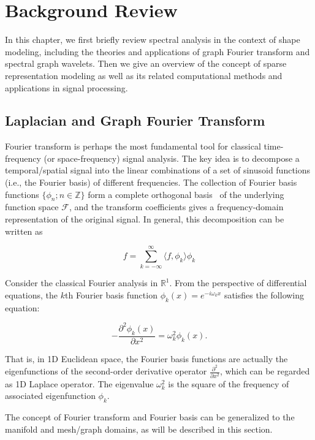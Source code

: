 \chapter{Background Review}
\label{chap:background}

In this chapter, we first briefly review spectral analysis in the context
of shape modeling, including the theories and applications of graph Fourier
transform and spectral graph wavelets. Then we give an overview of the
concept of sparse representation modeling as well as its related computational
methods and applications in signal processing.

\section{Laplacian and Graph Fourier Transform}

Fourier transform is perhaps the most fundamental tool for classical
time-frequency (or space-frequency) signal analysis. The key idea is to decompose
a temporal/spatial signal into the linear combinations of a set of sinusoid
functions (i.e., the Fourier basis) of different frequencies. The collection of
Fourier basis functions $\{\phi_n;n\in \mathbb{Z}\}$ form a complete orthogonal
basis~\cite{Gomes:1999} of the underlying function space $\mathcal{F}$, and the
transform coefficients gives a frequency-domain representation of the original
signal. In general, this decomposition can be written as

\begin{equation}
f=\sum_{k=-\infty}^\infty \langle f,\phi_k\rangle\phi_k
\end{equation}

Consider the classical Fourier analysis in $\mathbb{R}^1$. From the
perspective of differential equations, the $k$th Fourier basis function
$\phi_k(x)=e^{-i\omega_k x}$ satisfies the following equation:

\begin{equation}\label{eq:Helmholtz1D}
-\frac{\partial^2 \phi_k(x)}{\partial x^2}=\omega_k^2 \phi_k(x).
\end{equation}

That is, in 1D Euclidean space, the Fourier basis functions are
actually the eigenfunctions of the second-order derivative operator
$\frac{\partial^2}{\partial x^2}$, which can be regarded as 1D Laplace operator.
The eigenvalue $\omega_k^2$ is the square of the frequency of associated
eigenfunction $\phi_k$.

The concept of Fourier transform and Fourier basis can be generalized to the
manifold and mesh/graph domains, as will be described in this section.

